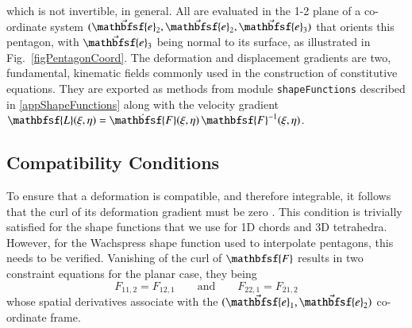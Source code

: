 which is not invertible, in general.  All are evaluated in the 1-2 plane of a co-ordinate system $( \vec{\mathbfsf{e}}_2 , \vec{\mathbfsf{e}}_2 , \vec{\mathbfsf{e}}_3 )$ that orients this pentagon, with $\vec{\mathbfsf{e}}_3$ being normal to its surface, as illustrated in Fig.~\ref{figPentagonCoord}.  The deformation and displacement gradients are two, fundamental, kinematic fields commonly used in the construction of constitutive equations.  They are exported as methods from module \texttt{shapeFunctions} described in \ref{appShapeFunctions} along with the velocity gradient $\mathbfsf{L} (\xi, \eta) = \dot{\mathbfsf{F}} (\xi, \eta) \, \mathbfsf{F}^{-1} (\xi, \eta)$.

\subsection{Compatibility Conditions}

To ensure that a deformation is compatible, and therefore integrable, it follows that the curl of its deformation gradient must be zero \cite{Clayton15}.  This condition is trivially satisfied for the shape functions that we use for 1D chords and 3D tetrahedra.  However, for the Wachspress shape function used to interpolate pentagons, this needs to be verified.  Vanishing of the curl of $\mathbfsf{F}$ results in two constraint equations for the planar case, they being
\begin{equation}
\label{compatibility}
F_{11,2} = F_{12,1} 
\qquad \text{and} \qquad
F_{22,1} = F_{21,2}
\end{equation}
whose spatial derivatives associate with the $( \vec{\mathbfsf{e}}_1 , \vec{\mathbfsf{e}}_2 )$ co-ordinate frame.

